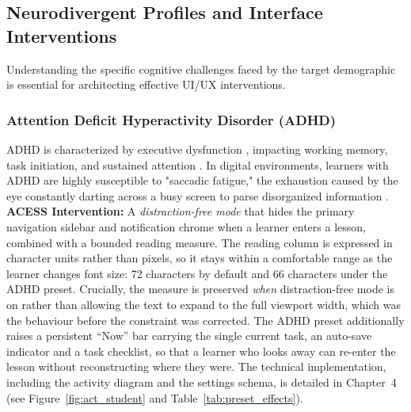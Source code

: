 \documentclass[12pt, oneside]{article} %
\begin{document}
\subsection{Neurodivergent Profiles and Interface Interventions}

Understanding the specific cognitive challenges faced by the target demographic is essential for architecting effective UI/UX interventions.

\subsubsection{Attention Deficit Hyperactivity Disorder (ADHD)}
ADHD is characterized by executive dysfunction \cite{zelazo2003executive}, impacting working memory, task initiation, and sustained attention \cite{barkley1997adhd}. In digital environments, learners with ADHD are highly susceptible to "saccadic fatigue," the exhaustion caused by the eye constantly darting across a busy screen to parse disorganized information \cite{munoz2003saccadic}.
\textbf{ACESS Intervention:} A \emph{distraction-free mode} that hides the primary navigation sidebar and notification chrome when a learner enters a lesson, combined with a bounded reading measure. The reading column is expressed in character units rather than pixels, so it stays within a comfortable range as the learner changes font size: 72 characters by default and 66 characters under the ADHD preset. Crucially, the measure is preserved \emph{when} distraction-free mode is on rather than allowing the text to expand to the full viewport width, which was the behaviour before the constraint was corrected. The ADHD preset additionally raises a persistent ``Now'' bar carrying the single current task, an auto-save indicator and a task checklist, so that a learner who looks away can re-enter the lesson without reconstructing where they were. The technical implementation, including the activity diagram and the settings schema, is detailed in Chapter~4 (see Figure~\ref{fig:act_student} and Table~\ref{tab:preset_effects}).
\end{document}
